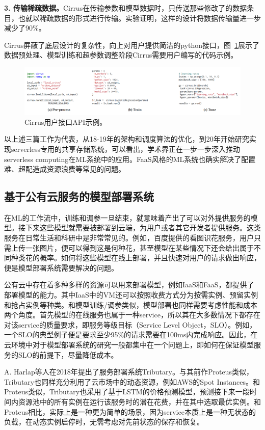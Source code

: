 \textbf{3. 传输稀疏数据。}Cirrus在传输参数和模型数据时，只传送那些修改了的数据条目，也就以稀疏数据的形式进行传输。实验证明，这样的设计将数据传输量进一步减少了90\%。

Cirrus屏蔽了底层设计的复杂性，向上对用户提供简洁的python接口，图~\ref{cirrus_api_example}展示了数据预处理、模型训练和超参数调整阶段Cirrus需要用户编写的代码示例。

\begin{figure}[h]
    \centerline{\includegraphics[width=\textwidth]{figures/cirrus-api-example.png}}
    \caption{Cirrus用户接口API示例。}
    \label{cirrus_api_example}
\end{figure}

以上述三篇工作为代表，从18-19年的架构和调度算法的优化，到20年开始研究实现serverless专用的共享存储系统，可以看出，学术界正在一步一步深入推动serverless computing在ML系统中的应用。FaaS风格的ML系统也确实解决了配置难、超配造成资源浪费等常见的问题。

\subsection{基于公有云服务的模型部署系统}
在ML的工作流中，训练和调参一旦结束，就意味着产出了可以对外提供服务的模型。接下来这些模型就需要被部署到云端，为用户或者其它开发者提供服务。这类服务在日常生活和科研中是非常常见的。例如，百度提供的看图识花服务，用户只需上传一张图片，便可以得到这是何种花，甚至模型在某些情况下还会给出属于不同种类花的概率。如何将这些模型在线上部署，并且快速对用户的请求做出响应，便是模型部署系统需要解决的问题。

公有云中存在着多种多样的资源可以用来部署模型，例如IaaS和FaaS，都提供了部署模型的能力。其中IaaS中的VM还可以按照收费方式分为按需实例、预留实例和抢占实例等种类。和模型训练/调参类似，模型部署也同样需要考虑性能和成本两个角度。首先模型的在线服务也属于一种service，所以其在大多数情况下都存在对该service的质量要求，即服务等级目标（Service Level Object，SLO）。例如，一个SLO的典型例子便是要求至少95\%的请求需要在100ms内完成响应。因此，在云环境中对于模型部署系统的研究一般都集中在一个问题上，即如何在保证模型服务的SLO的前提下，尽量降低成本。

A. Harlap等人在2018年提出了服务部署系统Tributary\parencite{harlap2018tributary}。与其前作Proteus类似，Tributary也同样充分利用了云市场中的动态资源，例如AWS的Spot Instances。和Proteus类似，Tributary也采用了基于LSTM的价格预测模型，预测接下来一段时间内资源池中的所有实例在运行该服务时的潜在花费，并在其中选取最优实例。和Proteus相比，实际上是一种更为简单的场景，因为service本质上是一种无状态的负载，在动态实例启停时，无需考虑对先前状态的保存和恢复。

